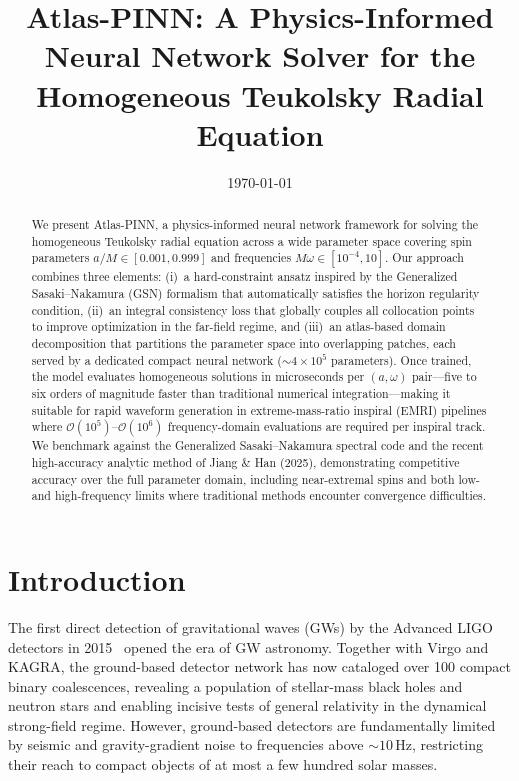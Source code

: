\documentclass[aps,prd,twocolumn,superscriptaddress,nofootinbib]{revtex4-2}
\begin{document}
\title{Atlas-PINN: A Physics-Informed Neural Network Solver for the \\
Homogeneous Teukolsky Radial Equation}

\author{}
\affiliation{}

\date{\today}

\begin{abstract}
We present Atlas-PINN, a physics-informed neural network framework for solving
the homogeneous Teukolsky radial equation across a wide parameter space covering
spin parameters $a/M \in [0.001, 0.999]$ and frequencies $M\omega \in
[10^{-4}, 10]$.  Our approach combines three elements: (i)~a hard-constraint
ansatz inspired by the Generalized Sasaki--Nakamura (GSN) formalism that
automatically satisfies the horizon regularity condition, (ii)~an integral
consistency loss that globally couples all collocation points to improve
optimization in the far-field regime, and (iii)~an atlas-based domain
decomposition that partitions the parameter space into overlapping patches,
each served by a dedicated compact neural network ($\sim 4\times 10^{5}$
parameters).  Once trained, the model evaluates homogeneous solutions in
microseconds per $(a,\omega)$ pair---five to six orders of magnitude faster than
traditional numerical integration---making it suitable for rapid waveform
generation in extreme-mass-ratio inspiral (EMRI) pipelines where
$\mathcal{O}(10^{5})$--$\mathcal{O}(10^{6})$ frequency-domain evaluations are
required per inspiral track.  We benchmark against the Generalized
Sasaki--Nakamura spectral code and the recent high-accuracy analytic method of
Jiang \& Han (2025), demonstrating competitive accuracy over the full parameter
domain, including near-extremal spins and both low- and high-frequency limits
where traditional methods encounter convergence difficulties.
\end{abstract}

\maketitle

\section{Introduction}

The first direct detection of gravitational waves (GWs) by the Advanced LIGO
detectors in 2015~\cite{Abbott:2016gw150914} opened the era of GW astronomy.
Together with Virgo and KAGRA, the ground-based detector network has now
cataloged over 100 compact binary coalescences, revealing a population of
stellar-mass black holes and neutron stars and enabling incisive tests of general
relativity in the dynamical strong-field regime.  However, ground-based
detectors are fundamentally limited by seismic and gravity-gradient noise to
frequencies above $\sim 10\,\text{Hz}$, restricting their reach to compact
objects of at most a few hundred solar masses.
\end{document}
